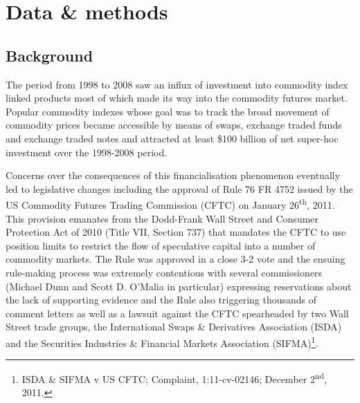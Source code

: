 \documentclass[
  authoryear,
  preprint,
  3p]{elsarticle}
\begin{document}
\newpage

\section{Data \& methods}\label{sec-data-methods}

\subsection{Background}\label{sec-background}

The period from 1998 to 2008 saw an influx of investment into commodity
index linked products most of which made its way into the commodity
futures market. Popular commodity indexes whose goal was to track the
broad movement of commodity prices became accessible by means of swaps,
exchange traded funds and exchange traded notes and attracted at least
\$100 billion of net super-hoc investment over the 1998-2008 period.

\medskip

Concerns over the consequences of this financialisation phenomenon
eventually led to legislative changes including the approval of Rule 76
FR 4752 issued by the US Commodity Futures Trading Commission (CFTC) on
January 26\textsuperscript{th}, 2011. This provision emanates from the
Dodd-Frank Wall Street and Consumer Protection Act of 2010 (Title VII,
Section 737) that mandates the CFTC to use position limits to restrict
the flow of speculative capital into a number of commodity markets. The
Rule was approved in a close 3-2 vote and the ensuing rule-making
process was extremely contentious with several commissioners (Michael
Dunn and Scott D. O'Malia in particular) expressing reservations about
the lack of supporting evidence and the Rule also triggering thousands
of comment letters as well as a lawsuit against the CFTC spearheaded by
two Wall Street trade groups, the International Swaps \& Derivatives
Association (ISDA) and the Securities Industries \& Financial Markets
Association (SIFMA)\footnote{ISDA \& SIFMA v US CFTC; Complaint,
  1:11-cv-02146; December 2\textsuperscript{nd}, 2011.}.

\medskip
\end{document}
